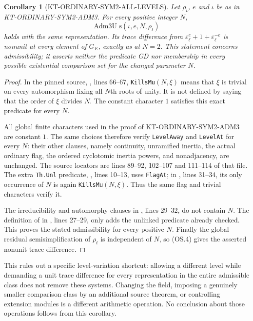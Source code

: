 \documentclass[11pt,a4paper]{article}
\newtheorem{corollary}[theorem]{Corollary}
\theoremstyle{definition}
\begin{document}
\begin{corollary}[KT-ORDINARY-SYM2-ALL-LEVELS]
Let $\rho_t$, $e$ and $\iota$ be as in
KT-ORDINARY-SYM2-ADM3. For every positive integer $N$,
\[
                  \mathrm{Adm3U\_s}(\iota,e,N,\rho_t)
\]
holds with the same representation. Its trace difference from
$\varepsilon_\ell^e+1+\varepsilon_\ell^{-e}$ is nonunit
at every element of $G_E$, exactly as at $N=2$.
This statement concerns admissibility; it asserts neither
the predicate GD nor membership in every possible existential
comparison set for the changed parameter $N$.
\end{corollary}
\begin{proof}
In the pinned source,
, lines 66--67,
\texttt{KillsMu}$(N,\xi)$ means that $\xi$ is trivial on
every automorphism fixing all $N$th roots of unity. It is
not defined by saying that the order of $\xi$ divides $N$.
The constant character $1$ satisfies this exact predicate
for every $N$.

All global finite characters used in the proof of
KT-ORDINARY-SYM2-ADM3 are constant $1$. The same choices
therefore verify \texttt{LevelAway} and \texttt{LevelAt}
for every $N$: their other clauses, namely continuity,
unramified inertia, the actual ordinary flag, the ordered
cyclotomic inertia powers, and nonadjacency, are unchanged.
The source locators are lines 89--92, 102--107 and
111--114 of that file. The extra \texttt{Th.Unl}
predicate, , lines
10--13, uses \texttt{FlagAt}; in
, lines 31--34,
its only occurrence of $N$ is again \texttt{KillsMu}$(N,\xi)$.
Thus the same flag and trivial characters verify it.

The irreducibility and automorphy clauses in
, lines 29--32,
do not contain $N$. The definition of 
in , lines 27--29, only adds the
unlinked predicate already checked. This proves the stated
admissibility for every positive $N$. Finally the global
residual semisimplification of $\rho_t$ is independent
of $N$, so (OS.4) gives the asserted nonunit trace difference.
\end{proof}

This rules out a specific level-variation shortcut: allowing
a different level while demanding a unit trace difference
for every representation in the entire admissible class
does not remove these systems. Changing the field, imposing
a genuinely smaller comparison class by an additional
source theorem, or controlling extension modules is a
different arithmetic operation. No conclusion about those
operations follows from this corollary.
\end{document}
